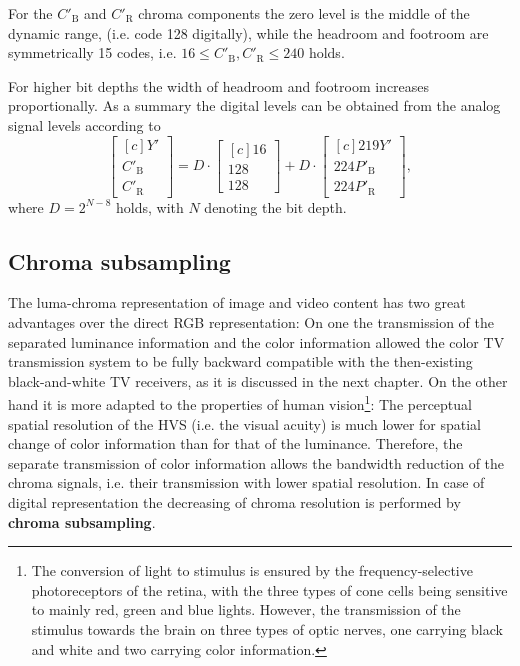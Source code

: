 For the $C'_\mathrm{B}$ and $C'_\mathrm{R}$ chroma components the zero level is the middle of the dynamic range, (i.e. code 128 digitally), while the headroom and footroom are symmetrically 15 codes, i.e. $16 \leq C'_\mathrm{B}, C'_\mathrm{R} \leq 240$ holds.

For higher bit depths the width of headroom and footroom increases proportionally.
As a summary the \ycbcr digital levels can be obtained from the \ypbpr analog signal levels according to
\begin{equation}
\begin{bmatrix}[c]
       Y' \\[0.3em]
       C'_{\mathrm{B}} \\[0.3em]
       C'_{\mathrm{R}} \end{bmatrix}
       =
D\cdot
\begin{bmatrix}[c]
       16 \\[0.3em]
       128 \\[0.3em]
       128 \end{bmatrix}
+
D\cdot
\begin{bmatrix}[c]
       219 Y' \\[0.3em]
       224 P'_\mathrm{B} \\[0.3em]
       224 P'_{\mathrm{R}} \end{bmatrix},
\end{equation}
where $D = 2^{N-8}$ holds, with $N$ denoting the bit depth.

\subsection{Chroma subsampling}
%
The luma-chroma representation of image and video content has two great advantages over the direct RGB representation:
On one the transmission of the separated luminance information and the color information allowed the color TV transmission system to be fully backward compatible with the then-existing black-and-white TV receivers, as it is discussed in the next chapter.
On the other hand it is more adapted to the properties of human vision\footnote{
The conversion of light to stimulus is ensured by the frequency-selective photoreceptors of the retina, with the three types of cone cells being sensitive to mainly red, green and blue lights.
However, the transmission of the stimulus towards the brain on three types of optic nerves, one carrying black and white and two carrying color information.}: 
The perceptual spatial resolution of the HVS (i.e. the visual acuity) is much lower for spatial change of color information than for that of the luminance.
Therefore, the separate transmission of color information allows the bandwidth reduction of the chroma signals, i.e. their transmission with lower spatial resolution.
In case of digital representation the decreasing of chroma resolution is performed by \textbf{chroma subsampling}.

